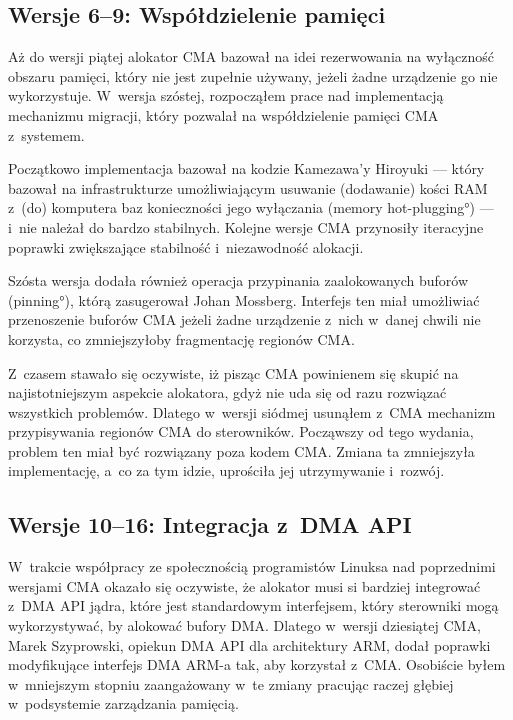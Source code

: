 \subsection{Wersje 6--9: Współdzielenie pamięci}

Aż do wersji piątej alokator CMA bazował na idei rezerwowania na
wyłączność obszaru pamięci, który nie jest zupełnie używany, jeżeli
żadne urządzenie go nie wykorzystuje.  W~wersja szóstej, rozpocząłem
prace nad implementacją mechanizmu migracji, który pozwalał na
współdzielenie pamięci CMA z~systemem.

Początkowo implementacja bazował na kodzie Kamezawa'y Hiroyuki ---
który bazował na infrastrukturze umożliwiającym usuwanie (dodawanie)
kości RAM z~(do) komputera baz konieczności jego wyłączania
(\ang{memory hot-plugging}) --- i~nie należał do bardzo stabilnych.
Kolejne wersje CMA przynosiły iteracyjne poprawki zwiększające
stabilność i~niezawodność alokacji.

Szósta wersja  dodała również operacja przypinania zaalokowanych
buforów (\ang{pinning}), którą zasugerował Johan Mossberg.  Interfejs
ten miał umożliwiać przenoszenie buforów CMA jeżeli żadne urządzenie
z~nich w~danej chwili nie korzysta, co zmniejszyłoby fragmentację
regionów CMA.

Z~czasem stawało się oczywiste, iż pisząc CMA powinienem się skupić na
najistotniejszym aspekcie alokatora, gdyż nie uda się od razu
rozwiązać wszystkich problemów.  Dlatego w~wersji siódmej usunąłem
z~CMA mechanizm przypisywania regionów CMA do sterowników.  Począwszy
od tego wydania, problem ten miał być rozwiązany poza kodem CMA.
Zmiana ta zmniejszyła implementację, a~co za tym idzie, uprościła jej
utrzymywanie i~rozwój.

\subsection{Wersje 10--16: Integracja z~DMA API}

W~trakcie współpracy ze społecznością programistów Linuksa nad
poprzednimi wersjami CMA okazało się oczywiste, że alokator musi si
bardziej integrować z~DMA API jądra, które jest standardowym
interfejsem, który sterowniki mogą wykorzystywać, by alokować bufory
DMA.  Dlatego w~wersji dziesiątej CMA, Marek Szyprowski, opiekun DMA
API dla architektury ARM, dodał poprawki modyfikujące interfejs DMA
ARM-a tak, aby korzystał z~CMA.  Osobiście byłem w~mniejszym stopniu
zaangażowany w~te zmiany pracując raczej głębiej w~podsystemie
zarządzania pamięcią.

